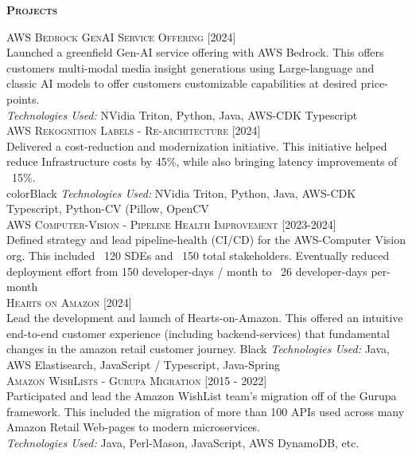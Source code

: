 \documentclass[letterpaper,12pt,final]{memoir}
\newcommand{\Sep}{\vspace{1.5em}}
\newcommand{\SmallSep}{\vspace{0.5em}}
\newcommand{\CVSection}[1]
	{\Large\textbf{\textsc{{#1}}}\par
	\SmallSep\normalsize\normalfont}
\newcommand{\CVItem}[1]
	{\textsc{\color{Plum} #1}}
\newcommand{\RightAlignedInlineText}[1]
{{\footnotesize \color{Plum}  \hfill [#1]}}
\begin{document}
\CVSection{Projects}
\CVItem{AWS Bedrock GenAI Service Offering }  \RightAlignedInlineText{2024}\\
{\footnotesize Launched a greenfield Gen-AI service offering with AWS Bedrock. This offers customers multi-modal media insight generations using Large-language and classic AI models to offer customers customizable capabilities at desired price-points. \\
	\emph{Technologies Used:} NVidia Triton, Python, Java, AWS-CDK Typescript}%
\SmallSep\\
\CVItem{AWS Rekognition Labels - Re-architecture} \RightAlignedInlineText{2024}\\
{\footnotesize Delivered a cost-reduction and modernization initiative. This initiative helped reduce Infrastructure costs by 45\%, while also bringing latency improvements of ~15\%. \\color{Black}
\emph{Technologies Used:} NVidia Triton, Python, Java, AWS-CDK Typescript, Python-CV (Pillow, OpenCV}%
\SmallSep\\
\CVItem{AWS Computer-Vision - Pipeline Health Improvement} \RightAlignedInlineText{2023-2024}\\
{\footnotesize Defined strategy and lead pipeline-health (CI/CD) for the AWS-Computer Vision org. This included ~120 SDEs and ~150 total stakeholders. Eventually reduced deployment effort from 150 developer-days / month to ~26 developer-days per-month}%
\SmallSep\\
\CVItem{Hearts on Amazon} \RightAlignedInlineText{2024}\\
{\footnotesize Lead the development and launch of Hearts-on-Amazon. This offered an intuitive end-to-end customer experience (including backend-services) that fundamental changes in the amazon retail customer journey.  {Black}
	\emph{Technologies Used:} Java, AWS Elastisearch, JavaScript / Typescript, Java-Spring}%
\SmallSep\\
\CVItem{Amazon WishLists - Gurupa Migration} \RightAlignedInlineText{2015 - 2022}\\
{\footnotesize Participated and lead the Amazon WishList team's migration off of the Gurupa framework. This included the migration of more than 100 APIs used across many Amazon Retail Web-pages to modern microservices.\\\color{Black}
	\emph{Technologies Used:} Java, Perl-Mason, JavaScript, AWS DynamoDB, etc.}%
\SmallSep\\
\end{document}
